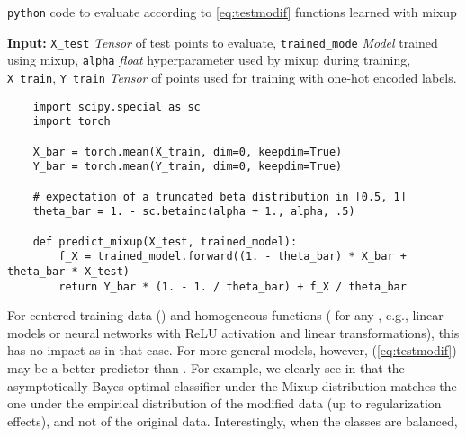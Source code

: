 \documentclass[twoside,11pt]{article}
\begin{document}
\begin{small}
    \begin{algorithm}[H]\small
        \caption{{\tt python} code to evaluate according to \eqref{eq:testmodif} functions learned with mixup
            \label{algo:pred-python}}
\vspace{-0.35cm}
        \begin{flushleft}
            {\bf Input:}  \texttt{X\_test} \textit{Tensor} of test points to evaluate, 
            \texttt{trained\_mode} \textit{Model} trained using mixup,
            \texttt{alpha} \textit{float} hyperparameter used by mixup during training, 
            \texttt{X\_train}, \texttt{Y\_train} \textit{Tensor} of points used for training with one-hot encoded labels.\\
        \end{flushleft}
        
     {\footnotesize
        \begin{center}
\begin{verbatim}
    import scipy.special as sc
    import torch
    
    X_bar = torch.mean(X_train, dim=0, keepdim=True)
    Y_bar = torch.mean(Y_train, dim=0, keepdim=True)
    
    # expectation of a truncated beta distribution in [0.5, 1]
    theta_bar = 1. - sc.betainc(alpha + 1., alpha, .5) 
    
    def predict_mixup(X_test, trained_model):
        f_X = trained_model.forward((1. - theta_bar) * X_bar + theta_bar * X_test)
        return Y_bar * (1. - 1. / theta_bar) + f_X / theta_bar
            \end{verbatim}
        \end{center}
    }
    \vspace{-0.35cm}
    
    \end{algorithm}
    \end{small}
For centered training data () and homogeneous functions 
( for any , e.g., linear models 
or neural networks with ReLU activation and linear transformations), 
this has no impact as  in that case. 
For more general models, however,  (\ref{eq:testmodif}) may be a better predictor than . 
For example, we clearly see in  that the asymptotically Bayes optimal classifier 
under the Mixup distribution matches the one under the empirical distribution of the modified data 
(up to regularization effects), and not of the original data. 
Interestingly, when the classes are balanced, 
\end{document}
